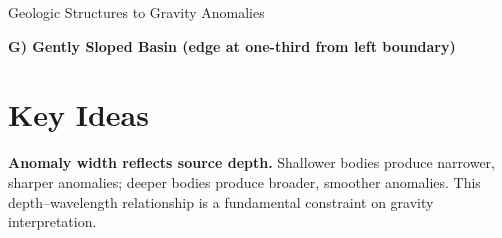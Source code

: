 \begin{activity}{Geologic Structures to Gravity Anomalies}
\bigskip\bigskip

\newpage
\begin{center}
\textbf{G) Gently Sloped Basin (edge at one-third from left boundary)}
\end{center}

\gax

\begin{center}
\end{center}

\bigskip\bigskip

\section*{Key Ideas}

\textbf{Anomaly width reflects source depth.} Shallower bodies produce narrower, sharper anomalies; deeper bodies produce broader, smoother anomalies. This depth--wavelength relationship is a fundamental constraint on gravity interpretation.

\begin{figure}[h]
\centering
{}
\end{figure}
\end{activity}
